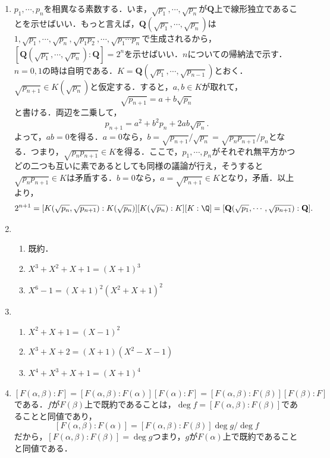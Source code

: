 \documentclass[a4paper,10pt]{ltjsarticle}
\begin{document}
\begin{enumerate}[]
  \item \label{enshu:1.9} $p_1, \cdots , p_n$を相異なる素数する．いま，$\sqrt{p_1}, \cdots , \sqrt{p_n}$が$\mathbf{Q}$上で線形独立であることを示せばいい．もっと言えば，$\mathbf{Q}(\sqrt{p_1}, \cdots , \sqrt{p_n})$は$1, \sqrt{p_1}, \cdots , \sqrt{p_n}, \sqrt{p_1p_2}, \cdots , \sqrt{p_1 \cdots p_n}$で生成されるから，$[\mathbf{Q}(\sqrt{p_1}, \cdots, \sqrt{p_n}) : \mathbf{Q}] = 2^n$を示せばいい．$n$についての帰納法で示す．$n = 0, 1$の時は自明である．$K = \mathbf{Q}(\sqrt{p_1}, \cdots , \sqrt{p_{n - 1}})$とおく．$\sqrt{p_{n + 1}} \in K(\sqrt{p_n})$と仮定する．すると，$a, b \in K$が取れて，
  \[ \sqrt{p_{n + 1}} = a + b\sqrt{p_n} \]
  と書ける．両辺を二乗して，
  \[ p_{n + 1} = a^2 + b^2p_n + 2ab\sqrt{p_n}. \]
  よって，$ab = 0$を得る．$a = 0$なら，$b = \sqrt{p_{n + 1}} / \sqrt{p_n} = \sqrt{p_np_{n + 1}} / p_n$となる．つまり，$\sqrt{p_np_{n + 1}} \in K$を得る．ここで，$p_1, \cdots , p_n$がそれぞれ無平方かつどの二つも互いに素であるとしても同様の議論が行え，そうすると$\sqrt{p_np_{n + 1}} \in K$は矛盾する．$b = 0$なら，$a = \sqrt{p_{n + 1}} \in K$となり，矛盾．以上より，
  \[ 2^{n + 1} = [K(\sqrt{p_n}, \sqrt{p_{n + 1}}) : K(\sqrt{p_n})][K(\sqrt{p_n}) : K][K : \Q] = [\mathbf{Q}(\sqrt{p_1}, \cdots , \sqrt{p_{n + 1}}) : \mathbf{Q}]. \]

  \item \label{enshu:1.10} \ 
  \begin{enumerate}
    \item \label{enshu:1.10.1} 既約．
    \item \label{enshu:1.10.2} $X^3 + X^2 + X + 1 = (X + 1)^3$
    \item \label{enshu:1.10.3} $X^6 - 1 = (X + 1)^2(X^2 + X + 1)^2$
  \end{enumerate}

  \item \label{enshu:1.11} \ 
  \begin{enumerate}
    \item \label{enshu:1.11.1} $X^2 + X + 1 = (X - 1)^2$
    \item \label{enshu:1.11.2} $X^3 + X + 2 = (X + 1)(X^2 - X - 1)$
    \item \label{enshu:1.11.3} $X^4 + X^3 + X + 1 = (X + 1)^4$
  \end{enumerate}
  
  \item \label{enshu:1.12} 
  \[ [F(\alpha, \beta) : F] = [F(\alpha, \beta) : F(\alpha)][F(\alpha) : F] = [F(\alpha, \beta) : F(\beta)][F(\beta) : F] \]
  である．$f$が$F(\beta)$上で既約であることは，$\deg f = [F(\alpha, \beta) : F(\beta)]$であることと同値であり，
  \[ [F(\alpha, \beta) : F(\alpha)] = [F(\alpha, \beta) : F(\beta)] \deg g / \deg f \]
  だから，$[F(\alpha, \beta) : F(\beta)] = \deg g$つまり，$g$が$F(\alpha)$上で既約であることと同値である．
  

\end{enumerate}
\end{document}
